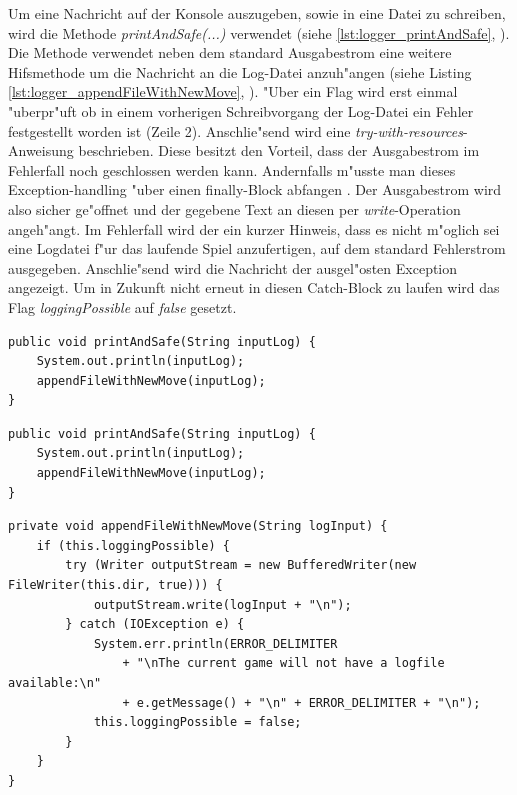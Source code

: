 Um eine Nachricht auf der Konsole auszugeben, sowie in eine Datei zu schreiben, wird die Methode \emph{printAndSafe(...)} verwendet (siehe \ref{lst:logger_printAndSafe}, ). Die Methode verwendet neben dem standard Ausgabestrom eine weitere Hifsmethode um die Nachricht an die Log-Datei anzuh"angen (siehe Listing \ref{lst:logger_appendFileWithNewMove}, ). "Uber ein Flag wird erst einmal "uberpr"uft ob in einem vorherigen Schreibvorgang der Log-Datei ein Fehler festgestellt worden ist (Zeile 2). Anschlie"send wird eine \emph{try-with-resources}-Anweisung beschrieben. Diese besitzt den Vorteil, dass der Ausgabestrom im Fehlerfall noch geschlossen werden kann. Andernfalls m"usste man dieses Exception-handling "uber einen finally-Block abfangen
\cite{try-with-resources}
. Der Ausgabestrom wird also sicher ge"offnet und der gegebene Text an diesen per \emph{write}-Operation angeh"angt. Im Fehlerfall wird der ein kurzer Hinweis, dass es nicht m"oglich sei eine Logdatei f"ur das laufende Spiel anzufertigen, auf dem standard Fehlerstrom ausgegeben. Anschlie"send wird die Nachricht der ausgel"osten Exception angezeigt. Um in Zukunft nicht erneut in diesen Catch-Block zu laufen wird das Flag \emph{loggingPossible} auf \emph{false} gesetzt. 

\begin{lstlisting}[float,style=CodeHighlighting,caption=Logger - printAndSafe,label=lst:logger_printAndSafe]
public void printAndSafe(String inputLog) {
    System.out.println(inputLog);
    appendFileWithNewMove(inputLog);
}
\end{lstlisting}

\begin{lstlisting}[float,style=CodeHighlighting,caption=Logger - printAndSafe,label=lst:logger_printAndSafe]
public void printAndSafe(String inputLog) {
    System.out.println(inputLog);
    appendFileWithNewMove(inputLog);
}
\end{lstlisting}

\begin{lstlisting}[float,style=CodeHighlighting,caption=Logger - appendFileWithNewMove,label=lst:logger_appendFileWithNewMove]
private void appendFileWithNewMove(String logInput) {
    if (this.loggingPossible) {
        try (Writer outputStream = new BufferedWriter(new FileWriter(this.dir, true))) {
            outputStream.write(logInput + "\n");
        } catch (IOException e) {
            System.err.println(ERROR_DELIMITER 
            	+ "\nThe current game will not have a logfile available:\n"
                + e.getMessage() + "\n" + ERROR_DELIMITER + "\n");
            this.loggingPossible = false;
        }
    }
}
\end{lstlisting}


